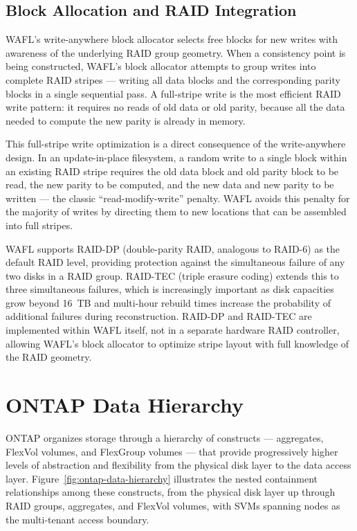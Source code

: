 \subsection{Block Allocation and RAID Integration}

WAFL's write-anywhere block allocator selects free blocks for new writes with awareness of the underlying RAID group geometry. When a consistency point is being constructed, WAFL's block allocator attempts to group writes into complete RAID stripes --- writing all data blocks and the corresponding parity blocks in a single sequential pass. A full-stripe write is the most efficient RAID write pattern: it requires no reads of old data or old parity, because all the data needed to compute the new parity is already in memory.

This full-stripe write optimization is a direct consequence of the write-anywhere design. In an update-in-place filesystem, a random write to a single block within an existing RAID stripe requires the old data block and old parity block to be read, the new parity to be computed, and the new data and new parity to be written --- the classic ``read-modify-write'' penalty. WAFL avoids this penalty for the majority of writes by directing them to new locations that can be assembled into full stripes.

WAFL supports RAID-DP (double-parity RAID, analogous to RAID-6) as the default RAID level, providing protection against the simultaneous failure of any two disks in a RAID group. RAID-TEC (triple erasure coding) extends this to three simultaneous failures, which is increasingly important as disk capacities grow beyond 16~TB and multi-hour rebuild times increase the probability of additional failures during reconstruction. RAID-DP and RAID-TEC are implemented within WAFL itself, not in a separate hardware RAID controller, allowing WAFL's block allocator to optimize stripe layout with full knowledge of the RAID geometry.

\section{ONTAP Data Hierarchy}

ONTAP organizes storage through a hierarchy of constructs --- aggregates, FlexVol volumes, and FlexGroup volumes --- that provide progressively higher levels of abstraction and flexibility from the physical disk layer to the data access layer. Figure~\ref{fig:ontap-data-hierarchy} illustrates the nested containment relationships among these constructs, from the physical disk layer up through RAID groups, aggregates, and FlexVol volumes, with SVMs spanning nodes as the multi-tenant access boundary.

